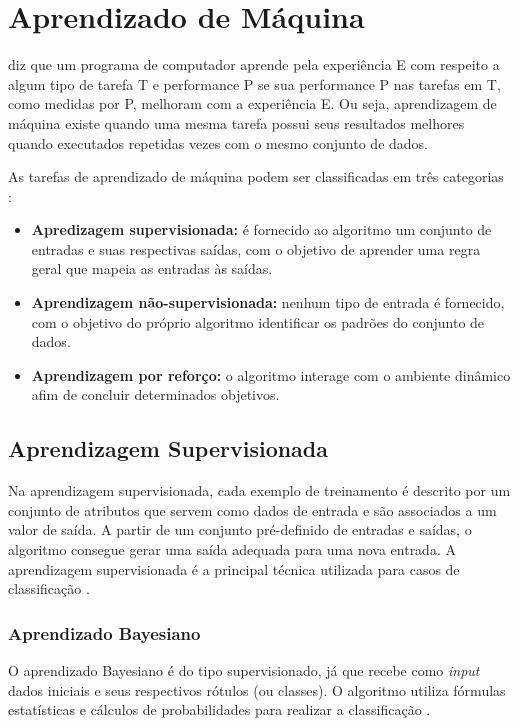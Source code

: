 \chapter{Aprendizado de Máquina}

 diz que um programa de computador aprende pela experiência E com respeito a algum tipo de tarefa T e performance P se sua performance P nas tarefas em T, como medidas por P, melhoram com a experiência E. Ou seja, aprendizagem de máquina existe quando uma mesma tarefa possui seus resultados melhores quando executados repetidas vezes com o mesmo conjunto de dados.

As tarefas de aprendizado de máquina podem ser classificadas em três categorias \cite{russel2003}:

\begin{itemize}
    \item \textbf{Apredizagem supervisionada:} é fornecido ao algoritmo um conjunto de entradas e suas respectivas saídas, com o objetivo de aprender uma regra geral que mapeia as entradas às saídas.
    \item \textbf{Aprendizagem não-supervisionada:} nenhum tipo de entrada é fornecido, com o objetivo do próprio algoritmo identificar os padrões do conjunto de dados.
    \item \textbf{Aprendizagem por reforço:} o algoritmo interage com o ambiente dinâmico afim de concluir determinados objetivos.
\end{itemize}


\section{Aprendizagem Supervisionada}

Na aprendizagem supervisionada, cada exemplo de treinamento é descrito por um conjunto de atributos que servem como dados de entrada e são associados a um valor de saída. A partir de um conjunto pré-definido de entradas e saídas, o algoritmo consegue gerar uma saída adequada para uma nova entrada. A aprendizagem supervisionada é a principal técnica utilizada para casos de classificação \cite{mohri2012}.

\subsection{Aprendizado Bayesiano}

O aprendizado Bayesiano é do tipo supervisionado, já que recebe como \textit{input} dados iniciais e seus respectivos rótulos (ou classes). O algoritmo utiliza fórmulas estatísticas e cálculos de probabilidades para realizar a classificação \cite{mitchell1997}.

